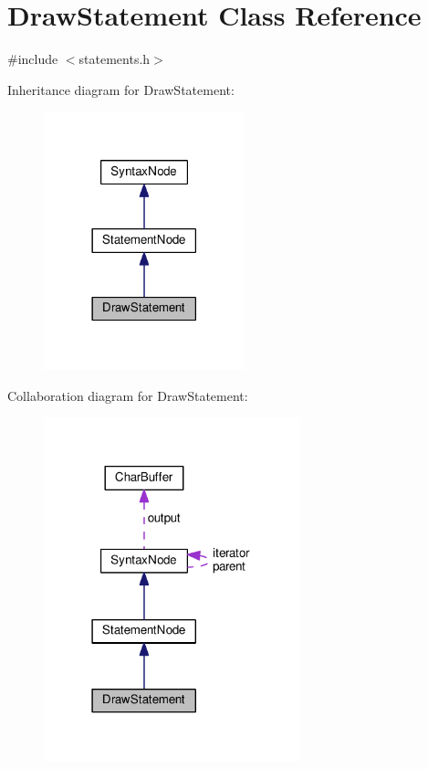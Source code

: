 \hypertarget{classDrawStatement}{}\section{Draw\+Statement Class Reference}
\label{classDrawStatement}


{\ttfamily \#include $<$statements.\+h$>$}



Inheritance diagram for Draw\+Statement\+:\nopagebreak
\begin{figure}[H]
\begin{center}
\leavevmode
\includegraphics[width=165pt]{classDrawStatement__inherit__graph}
\end{center}
\end{figure}


Collaboration diagram for Draw\+Statement\+:\nopagebreak
\begin{figure}[H]
\begin{center}
\leavevmode
\includegraphics[width=210pt]{classDrawStatement__coll__graph}
\end{center}
\end{figure}
